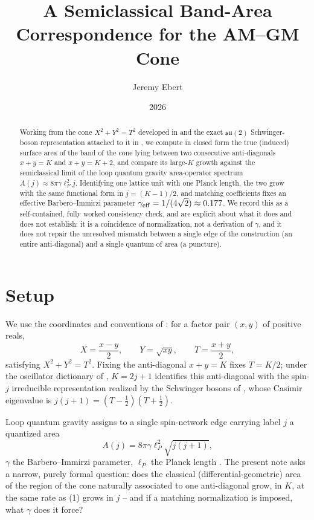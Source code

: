 \documentclass[11pt]{amsart}
\title{A Semiclassical Band-Area Correspondence for the AM--GM Cone}
\author{Jeremy Ebert}
\date{2026}
\theoremstyle{remark}
\begin{document}
\maketitle

\begin{abstract}
Working from the cone $X^2+Y^2=T^2$ developed in \cite{Ebert2026Table} and the exact
$\mathfrak{su}(2)$ Schwinger-boson representation attached to it in
\cite{Ebert2026Quantum}, we compute in closed form the
true (induced) surface area of the band of the cone lying between two consecutive
anti-diagonals $x+y=K$ and $x+y=K+2$, and compare its large-$K$ growth against the
semiclassical limit of the loop quantum gravity area-operator spectrum
$A(j)\approx 8\pi\gamma\ell_P^2 j$. Identifying one lattice unit with one Planck
length, the two grow with the same functional form in $j=(K-1)/2$, and matching
coefficients fixes an effective Barbero--Immirzi parameter $\gamma_{\rm eff}=1/(4\sqrt2)\approx0.177$.
We record this as a self-contained, fully worked consistency check, and are explicit
about what it does and does not establish: it is a coincidence of normalization, not a
derivation of $\gamma$, and it does not repair the unresolved mismatch between a
single edge of the construction (an entire anti-diagonal)
and a single quantum of area (a puncture).
\end{abstract}

\section{Setup}

We use the coordinates and conventions of \cite{Ebert2026Table}: for a factor pair
$(x,y)$ of positive reals,
\[
X=\frac{x-y}2,\qquad Y=\sqrt{xy},\qquad T=\frac{x+y}2,
\]
satisfying $X^2+Y^2=T^2$. Fixing the anti-diagonal $x+y=K$ fixes $T=K/2$; under the
oscillator dictionary of \cite[\S2]{Ebert2026Quantum}, $K=2j+1$ identifies this
anti-diagonal with the spin-$j$ irreducible representation realized by the
Schwinger bosons of \cite[\S3]{Ebert2026Quantum}, whose Casimir eigenvalue is
$j(j+1)=(T-\tfrac12)(T+\tfrac12)$.

Loop quantum gravity assigns to a single spin-network edge carrying label $j$ a
quantized area
\begin{equation}
A(j) = 8\pi\gamma\ell_P^2\sqrt{j(j+1)}, \tag{1}
\end{equation}
$\gamma$ the Barbero--Immirzi parameter, $\ell_P$ the Planck length \cite{Rovelli2004}.
The present note asks a narrow, purely formal question: does the classical
(differential-geometric) area of the region of the cone naturally associated to one
anti-diagonal grow, in $K$, at the same rate as (1) grows in $j$ -- and if a matching
normalization is imposed, what $\gamma$ does it force?
\end{document}
